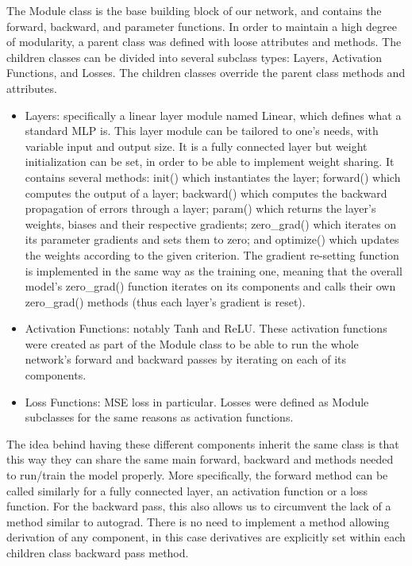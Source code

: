 \documentclass[10pt, a4paper]{article}
\begin{document}
The Module class is the base building block of our network, and contains the forward, backward, and parameter functions. In order to maintain a high degree of modularity, a parent class was defined with loose attributes and methods. The children classes can be divided into several subclass types: Layers, Activation Functions, and Losses. The children classes override the parent class methods and attributes.
\begin{itemize}
\item Layers: specifically a linear layer module named Linear, which defines what a standard MLP is. This layer module can be tailored to one's needs, with variable input and output size. It is a fully connected layer but weight initialization can be set, in order to be able to implement weight sharing. 
It contains several methods: init() which instantiates the layer; forward() which computes the output of a layer; backward() which computes the backward propagation of errors through a layer; param() which returns the layer's weights, biases and their respective gradients; zero\_grad() which iterates on its parameter gradients and sets them to zero; and optimize() which updates the weights according to the given criterion.
The gradient re-setting function is implemented in the same way as the training one, meaning that the overall model's zero\_grad() function iterates on its components and calls their own zero\_grad() methods (thus each layer's gradient is reset).

\item Activation Functions: notably Tanh and ReLU. These activation functions were created as part of the Module class to be able to run the whole network's forward and backward passes by iterating on each of its components.

\item Loss Functions: MSE loss in particular. Losses were defined as Module subclasses for the same reasons as activation functions.
\end{itemize}
The idea behind having these different components inherit the same class is that this way they can share the same main forward, backward and methods needed to run/train the model properly. More specifically, the forward method can be called similarly for a fully connected layer, an activation function or a loss function.
For the backward pass, this also allows us to circumvent the lack of a method similar to autograd. There is no need to implement a method allowing derivation of any component, in this case derivatives are explicitly set within each children class backward pass method.
\end{document}
